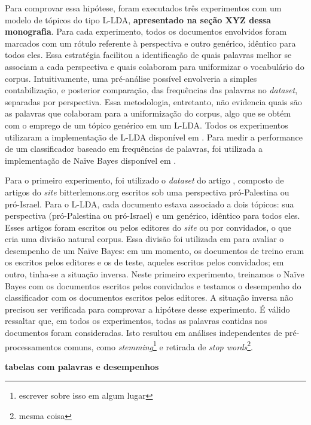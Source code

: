 Para comprovar essa hipótese, foram executados três experimentos com um modelo de tópicos do tipo L-LDA, \textbf{apresentado na seção XYZ dessa monografia}. Para cada experimento, todos os documentos envolvidos foram marcados com um rótulo referente à perspectiva e outro genérico, idêntico para todos eles. Essa estratégia facilitou a identificação de quais palavras melhor se associam a cada perspectiva e quais colaboram para uniformizar o vocabulário do corpus. Intuitivamente, uma pré-análise possível envolveria a simples contabilização, e posterior comparação, das frequências das palavras no \emph{dataset}, separadas por perspectiva. Essa metodologia, entretanto, não evidencia quais são as palavras que colaboram para a uniformização do corpus, algo que se obtém com o emprego de um tópico genérico em um L-LDA. Todos os experimentos utilizaram a implementação de L-LDA disponível em \cite{top-llda}. Para medir a performance de um classificador baseado em frequências de palavras, foi utilizada a implementação de Naïve Bayes disponível em \cite{alibezz-naive-bayes}. 

Para o primeiro experimento, foi utilizado o \emph{dataset} do artigo \cite{lin-et-al2006}, composto de artigos do \emph{site} bitterlemons.org escritos sob uma perspectiva pró-Palestina ou pró-Israel. Para o L-LDA, cada documento estava associado a dois tópicos: sua perspectiva (pró-Palestina ou pró-Israel) e um genérico, idêntico para todos eles. Esses artigos foram escritos ou pelos editores do \emph{site} ou por convidados, o que cria uma divisão natural corpus. Essa divisão foi utilizada em \cite{lin-et-al2006} para avaliar o desempenho de um Naïve Bayes: em um momento, os documentos de treino eram os escritos pelos editores e os de teste, aqueles escritos pelos convidados; em outro, tinha-se a situação inversa. Neste primeiro experimento, treinamos o Naïve Bayes com os documentos escritos pelos convidados e testamos o desempenho do classificador com os documentos escritos pelos editores. A situação inversa não precisou ser verificada para comprovar a hipótese desse experimento. É válido ressaltar que, em todos os experimentos, todas as palavras contidas nos documentos foram consideradas. Isto resultou em análises independentes de pré-processamentos comuns, como \emph{stemming}\footnote{escrever sobre isso em algum lugar} e retirada de \emph{stop words}\footnote{mesma coisa}.

\textbf{tabelas com palavras e desempenhos}


